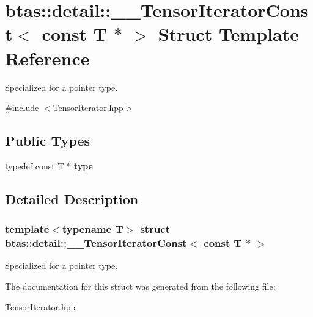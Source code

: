 \hypertarget{structbtas_1_1detail_1_1_____tensor_iterator_const_3_01const_01_t_01_5_01_4}{
\section{btas::detail::\_\-\_\-TensorIteratorConst$<$ const T $\ast$ $>$ Struct Template Reference}
\label{structbtas_1_1detail_1_1_____tensor_iterator_const_3_01const_01_t_01_5_01_4}
}


Specialized for a pointer type.  


{\ttfamily \#include $<$TensorIterator.hpp$>$}\subsection*{Public Types}
\begin{DoxyCompactItemize}
\item 
\hypertarget{structbtas_1_1detail_1_1_____tensor_iterator_const_3_01const_01_t_01_5_01_4_adc34aaaec97fe75374f477e88d6e3a05}{
typedef const T $\ast$ {\bfseries type}}
\label{structbtas_1_1detail_1_1_____tensor_iterator_const_3_01const_01_t_01_5_01_4_adc34aaaec97fe75374f477e88d6e3a05}

\end{DoxyCompactItemize}


\subsection{Detailed Description}
\subsubsection*{template$<$typename T$>$ struct btas::detail::\_\-\_\-TensorIteratorConst$<$ const T $\ast$ $>$}

Specialized for a pointer type. 

The documentation for this struct was generated from the following file:\begin{DoxyCompactItemize}
\item 
TensorIterator.hpp\end{DoxyCompactItemize}
